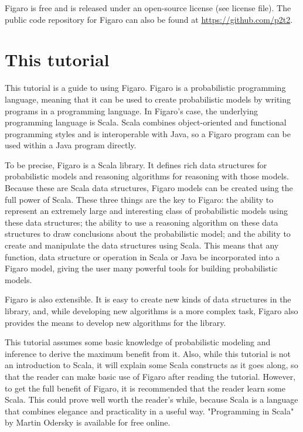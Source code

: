 Figaro is free and is released under an open-source license (see license file). The public code
repository for Figaro can also be found at \url{https://github.com/p2t2}.



\section{This tutorial}

This tutorial is a guide to using Figaro. Figaro is a probabilistic programming language, meaning that it can be used to create probabilistic models by writing programs in a programming language. In Figaro's case, the underlying programming language is Scala. Scala combines object-oriented and functional programming styles and is interoperable with Java, so a Figaro program can be used within a Java program directly.

To be precise, Figaro is a Scala library. It defines rich data structures for probabilistic models and reasoning algorithms for reasoning with those models. Because these are Scala data structures, Figaro
models can be created using the full power of Scala. These three things are the key to Figaro: the ability to represent an extremely large and interesting class of probabilistic models using these data structures;
the ability to use a reasoning algorithm on these data structures to draw conclusions about the probabilistic model; and the ability to create and manipulate the data structures using Scala. This means that any function, data structure or operation in Scala or Java be incorporated into a Figaro model, giving
the user many powerful tools for building probabilistic models.

Figaro is also extensible. It is easy to create new kinds of data structures in the library, and, while developing new algorithms is a more complex task, Figaro also provides the means to develop new
algorithms for the library.

This tutorial assumes some basic knowledge of probabilistic modeling and inference to derive the maximum benefit from it. Also, while this tutorial is not an introduction to Scala, it will explain some Scala constructs as it goes along, so that the reader can make basic use of Figaro after reading the tutorial. However, to get the full benefit of Figaro, it is recommended that the reader learn some Scala. This could prove well worth the reader's while, because Scala is a language that combines elegance and practicality in a useful way. "Programming in Scala" by Martin Odersky is available for free online.

